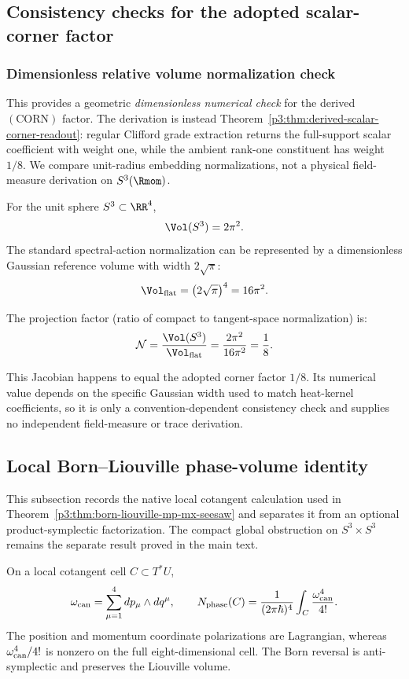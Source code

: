 \documentclass[11pt,a4paper]{article}
\begin{document}
\subsection{Consistency checks for the adopted scalar-corner factor}
\label{p3:app:oneeighth_checks}


\subsubsection{Dimensionless relative volume normalization check}
\label{p3:method:A}

This provides a geometric \emph{dimensionless numerical check} for the
derived \((\mathrm{CORN})\) factor.  The derivation is instead
Theorem~\ref{p3:thm:derived-scalar-corner-readout}: regular Clifford grade
extraction returns the full-support scalar coefficient with weight one, while
the ambient rank-one constituent has weight \(1/8\).  We compare unit-radius embedding
normalizations, not a physical field-measure derivation on \(S^3(\Rmom)\).

For the unit sphere \(S^3\subset\RR^4\),
\[
\Vol(S^3)=2\pi^2.
\]
The standard spectral-action normalization can be represented by a dimensionless Gaussian reference volume with width \(2\sqrt{\pi}\):
\[
\Vol_{\text{flat}} = \left(2\sqrt{\pi}\right)^4 = 16\pi^2.
\]

The projection factor (ratio of compact to tangent-space normalization) is:
\[
\mathcal{N} = \frac{\Vol(S^3)}{\Vol_{\text{flat}}} = \frac{2\pi^2}{16\pi^2} = \frac{1}{8}.
\]

This Jacobian happens to equal the adopted corner factor \(1/8\).  Its
numerical value depends on the specific Gaussian width used to match
heat-kernel coefficients, so it is only a convention-dependent consistency
check and supplies no independent field-measure or trace derivation.


\subsection{Local Born--Liouville phase-volume identity}
\label{p3:app:seesaw}
This subsection records the native local cotangent calculation used in
Theorem~\ref{p3:thm:born-liouville-mp-mx-seesaw} and separates it from an
optional product-symplectic factorization.  The compact global obstruction on
\(S^3\times S^3\) remains the separate result proved in the main text.

\begin{lemma}
\label{p3:thm:local-born-liouville-seesaw}
On a local cotangent cell \(C\subset T^*U\),
\[
 \omega_{\rm can}=\sum_{\mu=1}^{4}dp_\mu\wedge dq^\mu,
 \qquad
 N_{\rm phase}(C)=\frac{1}{(2\pi\hbar)^4}
 \int_C\frac{\omega_{\rm can}^4}{4!}.
\]
The position and momentum coordinate polarizations are Lagrangian, whereas
\(\omega_{\rm can}^4/4!\) is nonzero on the full eight-dimensional cell.
The Born reversal is anti-symplectic and preserves the Liouville volume.
\end{lemma}
\end{document}
